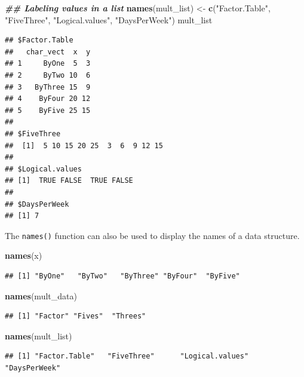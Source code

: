 \documentclass[
]{book}
\newenvironment{Shaded}{\begin{snugshade}}{\end{snugshade}}
\newcommand{\DocumentationTok}[1]{\textcolor[rgb]{0.56,0.35,0.01}{\textbf{\textit{#1}}}}
\newcommand{\FunctionTok}[1]{\textcolor[rgb]{0.13,0.29,0.53}{\textbf{#1}}}
\newcommand{\NormalTok}[1]{#1}
\newcommand{\OtherTok}[1]{\textcolor[rgb]{0.56,0.35,0.01}{#1}}
\newcommand{\StringTok}[1]{\textcolor[rgb]{0.31,0.60,0.02}{#1}}
\theoremstyle{definition}
\theoremstyle{definition}
\theoremstyle{definition}
\theoremstyle{definition}
\theoremstyle{remark}
\begin{document}
\begin{Shaded}
\begin{Highlighting}[]
\DocumentationTok{\#\# Labeling values in a list}
\FunctionTok{names}\NormalTok{(mult\_list) }\OtherTok{\textless{}{-}} \FunctionTok{c}\NormalTok{(}\StringTok{"Factor.Table"}\NormalTok{, }\StringTok{"FiveThree"}\NormalTok{, }\StringTok{"Logical.values"}\NormalTok{, }
                      \StringTok{"DaysPerWeek"}\NormalTok{)}
\NormalTok{mult\_list}
\end{Highlighting}
\end{Shaded}

\begin{verbatim}
## $Factor.Table
##   char_vect  x  y
## 1     ByOne  5  3
## 2     ByTwo 10  6
## 3   ByThree 15  9
## 4    ByFour 20 12
## 5    ByFive 25 15
## 
## $FiveThree
##  [1]  5 10 15 20 25  3  6  9 12 15
## 
## $Logical.values
## [1]  TRUE FALSE  TRUE FALSE
## 
## $DaysPerWeek
## [1] 7
\end{verbatim}

The \texttt{names()} function can also be used to display the names of a data structure.

\begin{Shaded}
\begin{Highlighting}[]
\FunctionTok{names}\NormalTok{(x)}
\end{Highlighting}
\end{Shaded}

\begin{verbatim}
## [1] "ByOne"   "ByTwo"   "ByThree" "ByFour"  "ByFive"
\end{verbatim}

\begin{Shaded}
\begin{Highlighting}[]
\FunctionTok{names}\NormalTok{(mult\_data)}
\end{Highlighting}
\end{Shaded}

\begin{verbatim}
## [1] "Factor" "Fives"  "Threes"
\end{verbatim}

\begin{Shaded}
\begin{Highlighting}[]
\FunctionTok{names}\NormalTok{(mult\_list)}
\end{Highlighting}
\end{Shaded}

\begin{verbatim}
## [1] "Factor.Table"   "FiveThree"      "Logical.values" "DaysPerWeek"
\end{verbatim}
\end{document}
